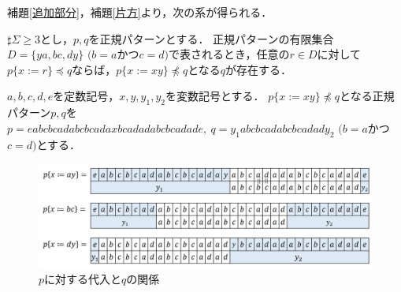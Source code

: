 補題\ref{追加部分}，補題\ref{片方}より，次の系が得られる．

\begin{col}\label{両方}
$\sharp \Sigma \ge 3$とし，$p, q$を正規パターンとする．
正規パターンの有限集合$D= \{ ya, bc, dy \}$ $(b = a$かつ$c = d)$で表されるとき，任意の$r \in D$に対して$p \{ x := r \} \preceq q$ならば，$p \{ x := xy \} \not \preceq q$となる$q$が存在する．
\end{col}
\begin{ex}
$a,b,c,d,e$を定数記号，$x,y,y_{1},y_{2}$を変数記号とする．
$p \{ x:=xy \} \not \preceq q$となる正規パターン$p,q$を$p=eabcbcadabcbcadaxbcadadabcbcadade,~q=y_{1}abcbcadabcbcadady_{2}$ $(b = a$かつ$c = d)$とする．
\end{ex}

\begin{figure}
\includegraphics[width=\linewidth]{figs/b=aとc=dの例.png}
\vspace{-1cm}
\caption{$p$に対する代入と$q$の関係}
\label{b=aとc=dの例}
\end{figure}

